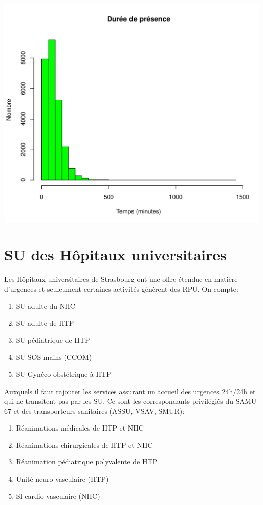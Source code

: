 \documentclass[12pt,english,french,twoside]{report}\usepackage[]{graphicx}\usepackage[]{color}
\makeatletter
\def\maxwidth{ %
  \ifdim\Gin@nat@width>\linewidth
    \linewidth
  \else
    \Gin@nat@width
  \fi
}
\newenvironment{knitrout}{}{} %
\makeatother
\begin{document}
\begin{knitrout}
\color{fgcolor}
\includegraphics[width=\maxwidth]{figure/graphe_odi} 

\end{knitrout}



\chapter{SU des Hôpitaux universitaires}



Les Hôpitaux universitaires de Strasbourg ont une offre étendue en matière d'urgences et seuleument certaines activités génèrent des RPU.
On compte:
\begin{enumerate}
  \item SU adulte du NHC
  \item SU adulte de HTP
  \item SU pédiatrique de HTP
  \item SU SOS mains (CCOM)
  \item SU Gynéco-obstétrique à HTP
\end{enumerate}
Auxquels il faut rajouter les services assurant un accueil des urgences 24h/24h et qui ne transitent pas par les SU. Ce sont les correspondants privilégiés du SAMU 67 et des transporteurs sanitaires (ASSU, VSAV, SMUR):
\begin{enumerate}
  \item Réanimations médicales de HTP et NHC
  \item Réanimations chirurgicales de HTP et NHC
  \item Réanimation pédiatrique polyvalente de HTP
  \item Unité neuro-vasculaire (HTP)
  \item SI cardio-vasculaire (NHC)
\end{enumerate}
\end{document}
